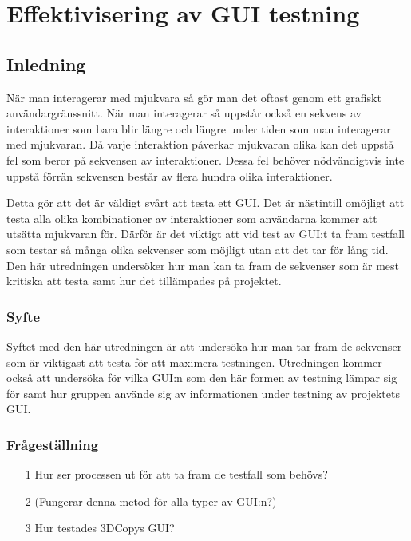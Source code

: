 \chapter{Effektivisering av GUI testning}
\label{cha:indiv-report-holmberg}

\section{Inledning}
\label{sec:introduction-holmberg}

När man interagerar med mjukvara så gör man det oftast genom ett grafiskt användargränssnitt. När man interagerar så uppstår också en sekvens av interaktioner som bara blir längre och längre under tiden som man interagerar med mjukvaran. Då varje interaktion påverkar mjukvaran olika kan det uppstå fel som beror på sekvensen av interaktioner. Dessa fel behöver nödvändigtvis inte uppstå förrän sekvensen består av flera hundra olika interaktioner.

Detta gör att det är väldigt svårt att testa ett GUI. Det är nästintill omöjligt att testa alla olika kombinationer av interaktioner som användarna kommer att utsätta mjukvaran för. Därför är det viktigt att vid test av GUI:t ta fram testfall som testar så många olika sekvenser som möjligt utan att det tar för lång tid. Den här utredningen undersöker hur man kan ta fram de sekvenser som är mest kritiska att testa samt hur det tillämpades på projektet.

\subsection{Syfte}
\label{sec:purpose-holmberg}

Syftet med den här utredningen är att undersöka hur man tar fram de sekvenser som är viktigast att testa för att maximera testningen. Utredningen kommer också att undersöka för vilka GUI:n som den här formen av testning lämpar sig för samt hur gruppen använde sig av informationen under testning av projektets GUI.

\subsection{Frågeställning}
\label{sec:issue-holmberg}

\begin{itemize}
	\item [1] Hur ser processen ut för att ta fram de testfall som behövs?
	\item [2] (Fungerar denna metod för alla typer av GUI:n?)
	\item [3] Hur testades 3DCopys GUI?
\end{itemize}

